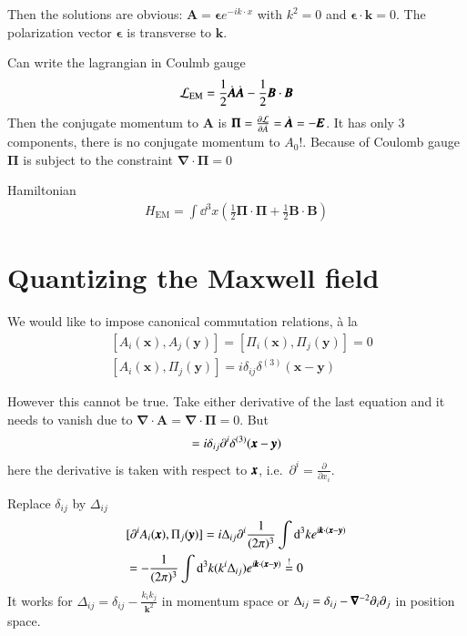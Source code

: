 Then the solutions are obvious: $\pmb{A} = \pmb{\epsilon} e^{-ik\cdot x}$ with $k^2=0$ and $\pmb{\epsilon}\cdot\pmb{k}=0$. The polarization vector $\pmb{\epsilon}$ is transverse to $\pmb{k}$.

Can write the lagrangian in Coulmb gauge 
\begin{align*}
	\mathcal{L}_\text{EM} = \frac{1}{2}\dot{\pmb{A}}\dot{\pmb{A}} - \frac{1}{2} \pmb{B}\cdot \pmb{B}
\end{align*}
Then the conjugate momentum to $\pmb{A}$ is $\pmb{\Pi} = \frac{\partial \mathcal{L}}{\partial \dot{A}} = \dot{\pmb{A}} = -\pmb{E}$. It has only 3 components, there is no conjugate momentum to $A_0$!. Because of Coulomb gauge $\pmb{\Pi}$ is subject to the constraint $\pmb{\nabla}\cdot\pmb{\Pi} = 0$

Hamiltonian
\begin{align*}
	H_{\text{EM}} = \int \dd^3 x \left( \frac{1}{2} \pmb{\Pi}\cdot\pmb{\Pi} + \frac{1}{2} \pmb{B}\cdot\pmb{B} \right)
\end{align*}

\section{Quantizing the Maxwell field}
We would like to impose canonical commutation relations, à la
\begin{align*}
	&[ A_i(\pmb{x}), A_j (\pmb{y}) ] =  [ \Pi_i(\pmb{x}), \Pi_j (\pmb{y}) ] = 0 \\
	&[A_i(\pmb{x}), \Pi_j(\pmb{y})] = i \delta_{ij} \delta^{(3)} (\pmb{x} - \pmb{y})
\end{align*}

However this cannot be true. Take either derivative of the last equation and it needs to vanish due to $\pmb{\nabla}\cdot\pmb{A} = \pmb{\nabla}\cdot \pmb{\Pi} = 0$. But 
\begin{align*}
	[\partial^i A_i (\vecx), \Pi_k(\vecy)] =  i \delta_{ij} \partial^i \delta^{(3)}(\vecx-\vecy)
\end{align*}
here the derivative is taken with respect to $\pmb{x}$, i.e.~$\partial^i = \frac{\partial}{\partial x_i}$.


Replace $\delta_{ij}$ by $\Delta_{ij}$
\begin{align*}
	& [\partial^i A_i (\pmb{x}), {\Pi}_{j}(\pmb{y})] = i \Delta_{ij} \partial^i \frac{1}{(2\pi)^3} \int \dd^3 k e^{i\pmb{k}\cdot(\pmb{x} - \pmb{y})} \\
	& = -\frac{1}{(2\pi)^3} \int \dd^3 k (k^i\Delta_{ij}) e^{i\pmb{k}\cdot(\pmb{x}-\pmb{y})} \stackrel{!}{=} 0
\end{align*}
It works for $\Delta_{ij} = \delta_{ij}-\frac{k_ik_j}{\pmb{k}^2}$ in momentum space or $\Delta_{ij} = \delta_{ij} - \pmb{\nabla}^{-2}\partial_i \partial_j$ in position space.

